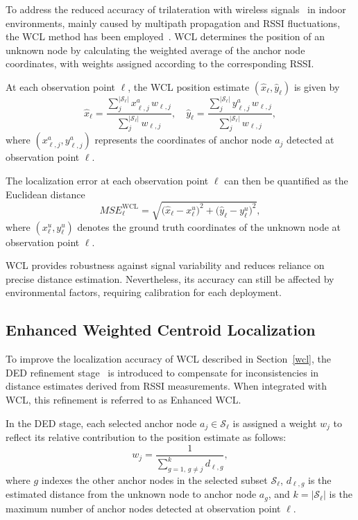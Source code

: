\documentclass[journal]{IEEEtran}
\begin{document}
To address the reduced accuracy of trilateration with wireless signals~\cite{trilat} in indoor environments, mainly caused by multipath propagation and RSSI fluctuations, the WCL method has been employed~\cite{hybrid}.
WCL determines the position of an unknown node by calculating the weighted average of the anchor node coordinates, with weights assigned according to the corresponding RSSI.

At each observation point $\ell$, the WCL position estimate $(\hat{x}_{\ell}, \hat{y}_{\ell})$ is given by
\begin{equation}
\hat{x}_{\ell} = \frac{\sum_{j}^{|\mathcal{S}_\ell|} x^a_{\ell,j} \, w_{\ell, j}}{\sum_{j}^{|\mathcal{S}_\ell|} w_{\ell, j}}, \quad
\hat{y}_{\ell} = \frac{\sum_{j}^{|\mathcal{S}_\ell|} y^a_{\ell,j} \, w_{\ell, j}}{\sum_{j}^{|\mathcal{S}_\ell|} w_{\ell, j}},
\end{equation}
where $(x^a_{\ell,j}, y^a_{\ell,j})$ represents the coordinates of anchor node $a_j$ detected at observation point $\ell$.

The localization error at each observation point $\ell$ can then be quantified as the Euclidean distance
\begin{equation}
\label{eq:mse_wcl}
MSE_{\ell}^{\text{WCL}} = \sqrt{\bigl(\hat{x}_\ell - x_\ell^u \bigr)^2 + \bigl(\hat{y}_\ell - y_\ell^u \bigr)^2},
\end{equation}
where $(x_\ell^u, y_\ell^u)$ denotes the ground truth coordinates of the unknown node at observation point $\ell$.

WCL provides robustness against signal variability and reduces reliance on precise distance estimation. Nevertheless, its accuracy can still be affected by environmental factors, requiring calibration for each deployment.

\subsection{Enhanced Weighted Centroid Localization}
\label{Enhanced WCL}

To improve the localization accuracy of WCL described in Section~\ref{wcl}, the DED refinement stage~\cite{hybrid,adaptive} is introduced to compensate for inconsistencies in distance estimates derived from RSSI measurements. When integrated with WCL, this refinement is referred to as Enhanced WCL.

In the DED stage, each selected anchor node $a_j \in \mathcal{S}_\ell$ is assigned a weight $w_j$ to reflect its relative contribution to the position estimate as follows:
\begin{equation}
\label{weighti}
w_j = \frac{1}{\sum_{g=1,\, g \neq j}^{k} d_{\ell,g}},
\end{equation}
where $g$ indexes the other anchor nodes in the selected subset $\mathcal{S}_\ell$, $d_{\ell,g}$ is the estimated distance from the unknown node to anchor node $a_g$, and $k=|\mathcal{S}_\ell|$ is the maximum number of anchor nodes detected at observation point $\ell$.
\end{document}
